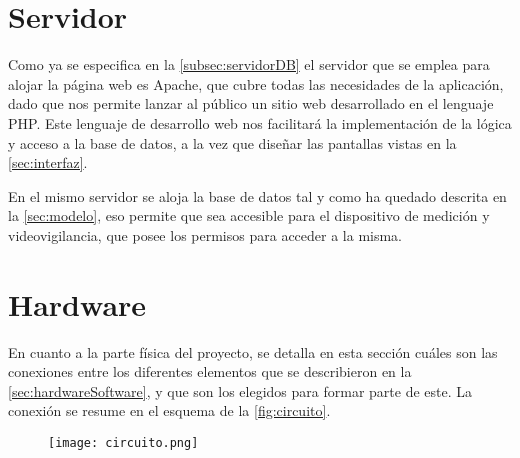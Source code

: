 \section{Servidor}\label{sec:servidor}
Como ya se especifica en la \autoref{subsec:servidorDB} el servidor que se emplea para alojar la página web es Apache, que cubre todas las necesidades de la aplicación, dado que nos permite lanzar al público un sitio web desarrollado en el lenguaje PHP. Este lenguaje de desarrollo web nos facilitará la implementación de la lógica y acceso a la base de datos, a la vez que diseñar las pantallas vistas en la \autoref{sec:interfaz}. 

En el mismo servidor se aloja la base de datos tal y como ha quedado descrita en la \autoref{sec:modelo}, eso permite que sea accesible para el dispositivo de medición y videovigilancia, que posee los permisos para acceder a la misma.
\pagebreak

\section{Hardware}\label{sec:hardware}
En cuanto a la parte física del proyecto, se detalla en esta sección cuáles son las conexiones entre los diferentes elementos que se describieron en la \autoref{sec:hardwareSoftware}, y que son los elegidos para formar parte de este. La conexión se resume en el esquema de la \autoref{fig:circuito}.
\begin{figure}[H]
	{\texttt{[image: circuito.png]}}
\end{figure}

